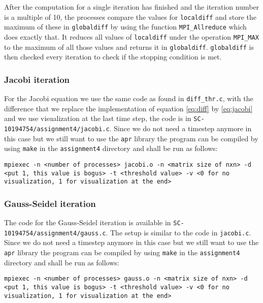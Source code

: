 \documentclass[11pt,a4paper,onecolumn]{article}
\begin{document}
After the computation for a single iteration has finished and the iteration number is a multiple of 10, the processes compare the values for \texttt{localdiff} and store the maximum of these in \texttt{globaldiff} by using the function \texttt{MPI\_Allreduce} which does exactly that. It reduces all values of \texttt{localdiff} under the operation \texttt{MPI\_MAX} to the maximum of all those values and returns it in \texttt{globaldiff}. \texttt{globaldiff} is then checked every iteration to check if the stopping condition is met.

\subsubsection{Jacobi iteration}
For the Jacobi equation we use the same code as found in \texttt{diff\_thr.c}, with the difference that we replace the implementation of equation \ref{eq:diff} by \ref{eq:jacobi} and we use visualization at the last time step, the code is in \texttt{SC-10194754/assignment4/jacobi.c}. Since we do not need a timestep anymore in this case but we still want to use the \texttt{apr} library the program can be compiled by using \texttt{make} in the \texttt{assignment4} directory and shall be run as follows:

\begin{center}
  \texttt{mpiexec -n <number of processes> jacobi.o -n <matrix size of nxn> -d <put 1, this value is bogus> -t <threshold value> -v <0 for no visualization, 1 for visualization at the end>}
\end{center}

\subsubsection{Gauss-Seidel iteration}
The code for the Gauss-Seidel iteration is available in \texttt{SC-10194754/assignment4/gauss.c}. The setup is similar to the code in \texttt{jacobi.c}. Since we do not need a timestep anymore in this case but we still want to use the \texttt{apr} library the program can be compiled by using \texttt{make} in the \texttt{assignment4} directory and shall be run as follows:

\begin{center}
  \texttt{mpiexec -n <number of processes> gauss.o -n <matrix size of nxn> -d <put 1, this value is bogus> -t <threshold value> -v <0 for no visualization, 1 for visualization at the end>}
\end{center}
\end{document}
